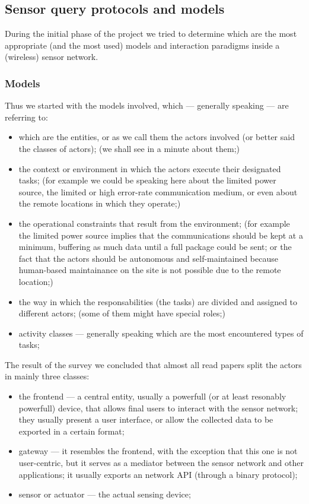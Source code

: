 
	\subsection{Sensor query protocols and models}

During the initial phase of the project we tried to determine which are the most appropriate (and the most used) models and interaction paradigms inside a (wireless) sensor network.

	\subsubsection{Models}

Thus we started with the models involved, which --- generally speaking --- are referring to:

\begin{itemize}
	\item which are the entities, or as we call them the actors involved (or better said the classes of actors); (we shall see in a minute about them;)
	\item the context or environment in which the actors execute their designated tasks; (for example we could be speaking here about the limited power source, the limited or high error-rate communication medium, or even about the remote locations in which they operate;)
	\item the operational constraints that result from the environment; (for example the limited power source implies that the communications should be kept at a minimum, buffering as much data until a full package could be sent; or the fact that the actors should be autonomous and self-maintained because human-based maintainance on the site is not possible due to the remote location;)
	\item the way in which the responsabilities (the tasks) are divided and assigned to different actors; (some of them might have special roles;)
	\item activity classes --- generally speaking which are the most encountered types of tasks;
\end{itemize}

The result of the survey we concluded that almost all read papers split the actors in mainly three classes:

\begin{itemize}
	\item the frontend --- a central entity, usually a powerfull (or at least resonably powerfull) device, that allows final users to interact with the sensor network; they usually present a user interface, or allow the collected data to be exported in a certain format;
	\item gateway --- it resembles the frontend, with the exception that this one is not user-centric, but it serves as a mediator between the sensor network and other applications; it usually exports an network API (through a binary protocol);
	\item sensor or actuator --- the actual sensing device;
\end{itemize}

